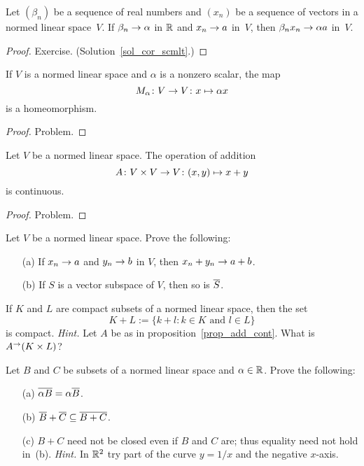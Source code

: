 \begin{cor}\label{cor_scmlt}  Let $(\beta_n)$ be a sequence of real numbers and $(x_n)$ be a
sequence of vectors in a normed linear space~$V$.  If $\beta_n \rightarrow \alpha$ in $\mathbb{R}$ and $x_n
\rightarrow a$ in~$V$, then $\beta_n x_n \rightarrow \alpha a$ in~$V$.
\end{cor}

\begin{proof} Exercise.  (Solution~\ref{sol_cor_scmlt}.) \ns  \end{proof}

\begin{cor} If $V$ is a normed linear space and $\alpha$ is a nonzero scalar, the map
  \[ M_\alpha \colon V \rightarrow V\colon x \mapsto \alpha x \]
is a homeomorphism.
\end{cor}

\begin{proof} Problem.   \ns  \end{proof}

\begin{prop}\label{prop_add_cont}  Let $V$ be a normed linear space.  The operation of addition
  \[ A\colon V \times V \rightarrow V\colon (x,y) \mapsto x + y \]
is continuous.
\end{prop}

\begin{proof} Problem.   \ns  \end{proof}

\begin{prob}\label{prob_clo_subsp}  Let $V$ be a normed linear space.  Prove the following:
 \begin{enumerate}
  \item[(a)] If $x_n \rightarrow a$ and $y_n \rightarrow b$ in $V$, then $x_n + y_n \rightarrow a + b$.
  \item[(b)] If $S$ is a vector subspace of $V$, then so is $\overline{S}$.
 \end{enumerate}
\end{prob}

\begin{prob}\label{prob_sum_cpt} If $K$ and $L$ are compact subsets of a normed linear space,
then the set
  \[ K + L := \{k + l\colon k \in K \text{ and } l \in L\} \]
is compact. \emph{Hint.}  Let $A$ be as in proposition~\ref{prop_add_cont}.  What is $A^\rightarrow(K
\times L)$?
\end{prob}

\begin{prob}\label{prob_sums_nls}  Let $B$ and $C$ be subsets of a normed linear space and
$\alpha \in \mathbb{R}$.  Prove the following:
 \begin{enumerate}
  \item[(a)] $\overline{\alpha B} = \alpha \overline{B}$.
  \item[(b)] $\overline{B} + \overline{C} \subseteq \overline{B + C}$.
  \item[(c)] $B + C$ need not be closed even if $B$ and $C$ are; thus equality need not hold
in~(b).  \emph{Hint.}  In $\mathbb{R}^2$ try part of the curve $y = 1/x$ and the negative $x$-axis.
 \end{enumerate}
\end{prob}


